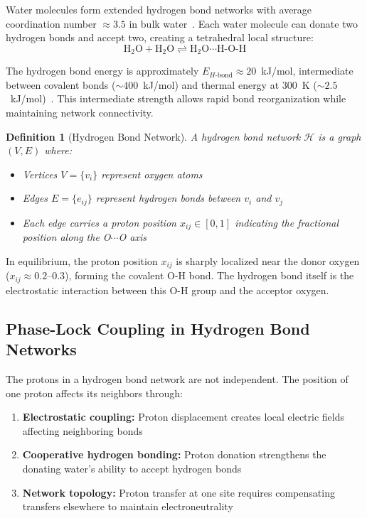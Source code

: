 \documentclass[twocolumn,showpacs,preprintnumbers,amsmath,amssymb,prd]{revtex4-2}
\newtheorem{definition}[theorem]{Definition}
\newcommand{\Hbond}{H\text{-bond}}
\begin{document}
Water molecules form extended hydrogen bond networks with average coordination number $\approx 3.5$ in bulk water~\cite{Stillinger1980}. Each water molecule can donate two hydrogen bonds and accept two, creating a tetrahedral local structure:
\begin{equation}
\text{H}_2\text{O} + \text{H}_2\text{O} \rightleftharpoons \text{H}_2\text{O}\cdots\text{H-O-H}
\label{eq:hbond}
\end{equation}

The hydrogen bond energy is approximately $E_{\Hbond} \approx 20$~kJ/mol, intermediate between covalent bonds ($\sim 400$~kJ/mol) and thermal energy at 300~K ($\sim 2.5$~kJ/mol)~\cite{Jeffrey1997}. This intermediate strength allows rapid bond reorganization while maintaining network connectivity.

\begin{definition}[Hydrogen Bond Network]
\label{def:hbond_network}
A hydrogen bond network $\mathcal{H}$ is a graph $(V, E)$ where:
\begin{itemize}
\item Vertices $V = \{v_i\}$ represent oxygen atoms
\item Edges $E = \{e_{ij}\}$ represent hydrogen bonds between $v_i$ and $v_j$
\item Each edge carries a proton position $x_{ij} \in [0, 1]$ indicating the fractional position along the O$\cdots$O axis
\end{itemize}
\end{definition}

In equilibrium, the proton position $x_{ij}$ is sharply localized near the donor oxygen ($x_{ij} \approx 0.2$--$0.3$), forming the covalent O-H bond. The hydrogen bond itself is the electrostatic interaction between this O-H group and the acceptor oxygen.

\subsection{Phase-Lock Coupling in Hydrogen Bond Networks}

The protons in a hydrogen bond network are not independent. The position of one proton affects its neighbors through:
\begin{enumerate}
\item \textbf{Electrostatic coupling:} Proton displacement creates local electric fields affecting neighboring bonds
\item \textbf{Cooperative hydrogen bonding:} Proton donation strengthens the donating water's ability to accept hydrogen bonds
\item \textbf{Network topology:} Proton transfer at one site requires compensating transfers elsewhere to maintain electroneutrality
\end{enumerate}
\end{document}
